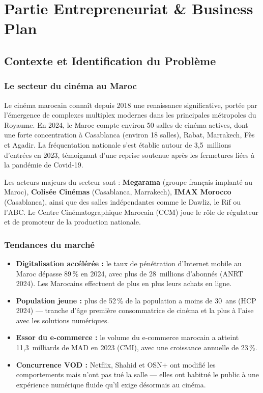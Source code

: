 \documentclass[12pt,a4paper,openany]{report}
\begin{document}
\chapter{Partie Entrepreneuriat \& Business Plan}

\section{Contexte et Identification du Problème}

\subsection{Le secteur du cinéma au Maroc}

Le cinéma marocain connaît depuis 2018 une renaissance significative, portée par l'émergence de complexes multiplex modernes dans les principales métropoles du Royaume. En 2024, le Maroc compte environ 50 salles de cinéma actives, dont une forte concentration à Casablanca (environ 18 salles), Rabat, Marrakech, Fès et Agadir. La fréquentation nationale s'est établie autour de 3,5~millions d'entrées en 2023, témoignant d'une reprise soutenue après les fermetures liées à la pandémie de Covid-19.

Les acteurs majeurs du secteur sont : \textbf{Megarama} (groupe français implanté au Maroc), \textbf{Colisée Cinémas} (Casablanca, Marrakech), \textbf{IMAX Morocco} (Casablanca), ainsi que des salles indépendantes comme le Dawliz, le Rif ou l'ABC. Le Centre Cinématographique Marocain (CCM) joue le rôle de régulateur et de promoteur de la production nationale.

\subsection{Tendances du marché}

\begin{itemize}
  \item \textbf{Digitalisation accélérée :} le taux de pénétration d'Internet mobile au Maroc dépasse 89\,\% en 2024, avec plus de 28~millions d'abonnés (ANRT 2024). Les Marocains effectuent de plus en plus leurs achats en ligne.
  \item \textbf{Population jeune :} plus de 52\,\% de la population a moins de 30~ans (HCP 2024) — tranche d'âge première consommatrice de cinéma et la plus à l'aise avec les solutions numériques.
  \item \textbf{Essor du e-commerce :} le volume du e-commerce marocain a atteint 11,3~milliards de MAD en 2023 (CMI), avec une croissance annuelle de 23\,\%.
  \item \textbf{Concurrence VOD :} Netflix, Shahid et OSN+ ont modifié les comportements mais n'ont pas tué la salle — elles ont habitué le public à une expérience numérique fluide qu'il exige désormais au cinéma.
\end{itemize}
\end{document}
